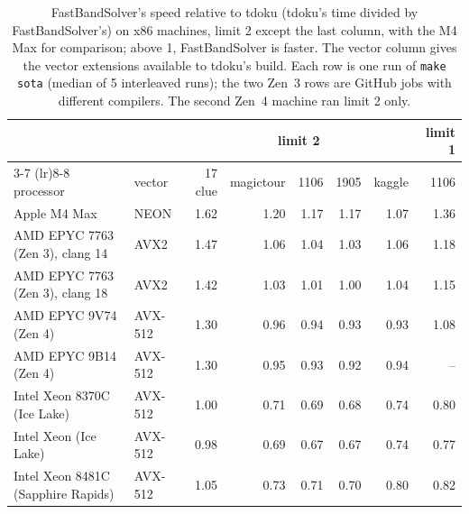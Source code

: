 \documentclass[11pt]{article}
\theoremstyle{definition}
\theoremstyle{plain}
\begin{document}
\begin{table}[t]
\centering
\caption{FastBandSolver's speed relative to tdoku (tdoku's time divided by FastBandSolver's) on x86 machines,
limit 2 except the last column, with the M4 Max for comparison; above 1, FastBandSolver is faster. The vector column
gives the vector extensions available to tdoku's build. Each row is one run of \texttt{make sota} (median of 5
interleaved runs); the two Zen~3 rows are GitHub jobs with different compilers. The second Zen~4 machine ran limit 2
only.}
\label{tab:x86}
\small
\setlength{\tabcolsep}{3.5pt}
\begin{tabular}{llrrrrrr}
\toprule
& & \multicolumn{5}{c}{limit 2} & limit 1 \\
\cmidrule(lr){3-7} \cmidrule(lr){8-8}
processor & vector & 17 clue & magictour & 1106 & 1905 & kaggle & 1106 \\
\midrule
Apple M4 Max & NEON & 1.62 & 1.20 & 1.17 & 1.17 & 1.07 & 1.36 \\
\midrule
AMD EPYC 7763 (Zen 3), clang 14 & AVX2 & 1.47 & 1.06 & 1.04 & 1.03 & 1.06 & 1.18 \\
AMD EPYC 7763 (Zen 3), clang 18 & AVX2 & 1.42 & 1.03 & 1.01 & 1.00 & 1.04 & 1.15 \\
AMD EPYC 9V74 (Zen 4) & AVX-512 & 1.30 & 0.96 & 0.94 & 0.93 & 0.93 & 1.08 \\
AMD EPYC 9B14 (Zen 4) & AVX-512 & 1.30 & 0.95 & 0.93 & 0.92 & 0.94 & -- \\
Intel Xeon 8370C (Ice Lake) & AVX-512 & 1.00 & 0.71 & 0.69 & 0.68 & 0.74 & 0.80 \\
Intel Xeon (Ice Lake) & AVX-512 & 0.98 & 0.69 & 0.67 & 0.67 & 0.74 & 0.77 \\
Intel Xeon 8481C (Sapphire Rapids) & AVX-512 & 1.05 & 0.73 & 0.71 & 0.70 & 0.80 & 0.82 \\
\bottomrule
\end{tabular}
\end{table}
\end{document}
